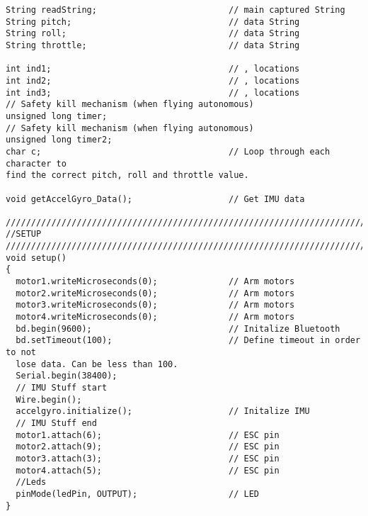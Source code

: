 \begin{lstlisting}
String readString;                          // main captured String
String pitch;                               // data String
String roll;                                // data String
String throttle;                            // data String
 
int ind1;                                   // , locations
int ind2;                                   // , locations
int ind3;                                   // , locations
// Safety kill mechanism (when flying autonomous)
unsigned long timer;                        
// Safety kill mechanism (when flying autonomous)
unsigned long timer2;                       
char c;                                     // Loop through each character to 
find the correct pitch, roll and throttle value.

void getAccelGyro_Data();                   // Get IMU data

//////////////////////////////////////////////////////////////////////////////
//SETUP
//////////////////////////////////////////////////////////////////////////////
void setup()
{
  motor1.writeMicroseconds(0);              // Arm motors
  motor2.writeMicroseconds(0);              // Arm motors
  motor3.writeMicroseconds(0);              // Arm motors
  motor4.writeMicroseconds(0);              // Arm motors
  bd.begin(9600);                           // Initalize Bluetooth
  bd.setTimeout(100);                       // Define timeout in order to not 
  lose data. Can be less than 100.
  Serial.begin(38400);                      
  // IMU Stuff start
  Wire.begin();
  accelgyro.initialize();                   // Initalize IMU
  // IMU Stuff end
  motor1.attach(6);                         // ESC pin
  motor2.attach(9);                         // ESC pin
  motor3.attach(3);                         // ESC pin
  motor4.attach(5);                         // ESC pin
  //Leds
  pinMode(ledPin, OUTPUT);                  // LED
}


\end{lstlisting}
